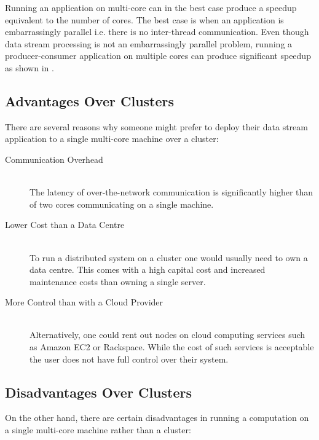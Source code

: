 \documentclass[bsc,logo,frontabs,twoside,singlespacing,normalheadings,parskip]{infthesis}\usepackage[]{graphicx}\usepackage[]{color}
\begin{document}
Running an application on multi-core can in the best case produce a speedup equivalent to the number of cores. The best case is when an application is embarrassingly parallel i.e. there is no inter-thread communication. Even though data stream processing is not an embarrassingly parallel problem, running a producer-consumer application on multiple cores can produce significant speedup as shown in  \citep{Prat-Perez:2013:PPM:2450027.2450037}.

\subsection{Advantages Over Clusters}
\label{subsec:advantages}

There are several reasons why someone might prefer to deploy their data stream application to a single multi-core machine over a cluster:

\begin{description}
	\item[Communication Overhead] \hfill \\
	The latency of over-the-network communication is significantly higher than of two cores communicating on a single machine.
	\item[Lower Cost than a Data Centre] \hfill \\
	To run a distributed system on a cluster one would usually need to own a data centre. This comes with a high capital cost and increased maintenance costs than owning a single server.
	\item[More Control than with a Cloud Provider] \hfill \\
	Alternatively, one could rent out nodes on cloud computing services such as Amazon EC2 or Rackspace. While the cost of such services is acceptable the user does not have full control over their system.
\end{description}

\subsection{Disadvantages Over Clusters}
\label{subsec:disadvantages}

On the other hand, there are certain disadvantages in running a computation on a single multi-core machine rather than a cluster:
\end{document}
